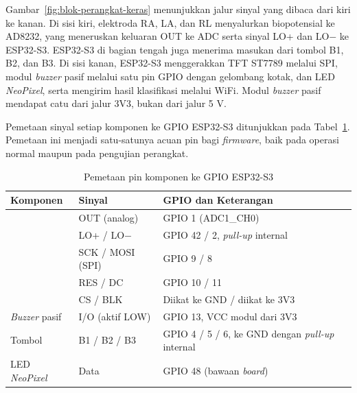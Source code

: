 Gambar~\ref{fig:blok-perangkat-keras} menunjukkan jalur sinyal yang dibaca dari kiri ke kanan. Di sisi kiri, elektroda RA, LA, dan RL menyalurkan biopotensial ke AD8232, yang meneruskan keluaran OUT ke ADC serta sinyal LO+ dan LO$-$ ke ESP32-S3. ESP32-S3 di bagian tengah juga menerima masukan dari tombol B1, B2, dan B3. Di sisi kanan, ESP32-S3 menggerakkan TFT ST7789 melalui SPI, modul \textit{buzzer} pasif melalui satu pin GPIO dengan gelombang kotak, dan LED \textit{NeoPixel}, serta mengirim hasil klasifikasi melalui WiFi. Modul \textit{buzzer} pasif mendapat catu dari jalur 3V3, bukan dari jalur 5 V.

Pemetaan sinyal setiap komponen ke GPIO ESP32-S3 ditunjukkan pada Tabel~\ref{tab:pin-map}. Pemetaan ini menjadi satu-satunya acuan pin bagi \textit{firmware}, baik pada operasi normal maupun pada pengujian perangkat.

\begin{table}[!ht]
  \centering
  \caption{Pemetaan pin komponen ke GPIO ESP32-S3}
  \label{tab:pin-map}
  \small
  \setlength{\tabcolsep}{4pt}
  \renewcommand{\arraystretch}{1.15}
  \begin{tabularx}{\linewidth}{>{\RaggedRight\arraybackslash}p{3.0cm}>{\RaggedRight\arraybackslash}p{3.4cm}>{\RaggedRight\arraybackslash}X}
    \toprule
    \textbf{Komponen} & \textbf{Sinyal} & \textbf{GPIO dan Keterangan} \\
    \midrule
    \multirow{2}{*}{AD8232} & OUT (analog) & GPIO 1 (ADC1\_CH0) \\
    & LO+ / LO$-$ & GPIO 42 / 2, \textit{pull-up} internal \\
    \midrule
    \multirow{3}{*}{TFT ST7789} & SCK / MOSI (SPI) & GPIO 9 / 8 \\
    & RES / DC & GPIO 10 / 11 \\
    & CS / BLK & Diikat ke GND / diikat ke 3V3 \\
    \midrule
    \textit{Buzzer} pasif & I/O (aktif LOW) & GPIO 13, VCC modul dari 3V3 \\
    \midrule
    Tombol & B1 / B2 / B3 & GPIO 4 / 5 / 6, ke GND dengan \textit{pull-up} internal \\
    \midrule
    LED \textit{NeoPixel} & Data & GPIO 48 (bawaan \textit{board}) \\
    \bottomrule
  \end{tabularx}
\end{table}

